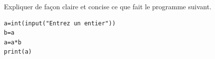 \begin{exo}{}
	Expliquer de façon claire et concise ce que fait le programme suivant.

	\begin{lstlisting}
a=int(input("Entrez un entier"))
b=a
a=a*b
print(a)
\end{lstlisting}
\end{exo}
